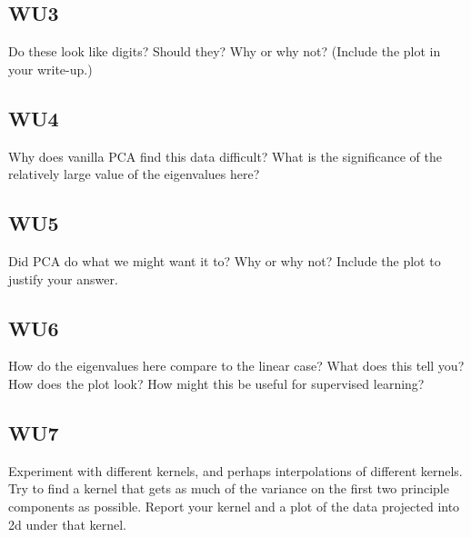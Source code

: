 \documentclass[a4paper,11pt]{article}
\begin{document}
\subsection{WU3}
\textsf{Do these look like digits? Should they? Why or why not?
(Include the plot in your write-up.)}
\subsection{WU4}
\textsf{Why does vanilla PCA find this data difficult? What is the
significance of the relatively large value of the eigenvalues here?}
\subsection{WU5}
\textsf{Did PCA do what we might want it to? Why or why not? Include
the plot to justify your answer.}
\subsection{WU6}
\textsf{How do the eigenvalues here compare to the linear case? What
does this tell you? How does the plot look? How might this be useful
for supervised learning?}
\subsection{WU7}
\textsf{Experiment with different kernels, and perhaps interpolations of different kernels. Try to find a kernel that gets as much of the variance on the first two principle components as possible. Report your kernel and a plot of the data projected into 2d under that kernel.}
\pagebreak
\end{document}
